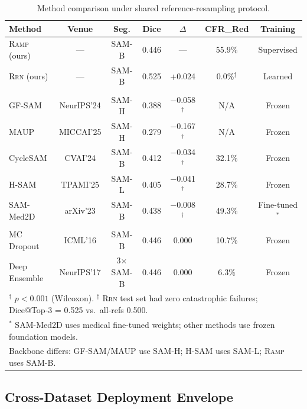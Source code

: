 \documentclass[10pt,twocolumn,letterpaper]{article}
\newcommand{\RAMP}{\textsc{Ramp}}
\newcommand{\RRN}{\textsc{Rrn}}
\begin{document}
\begin{table}[t]
\centering
\caption{Method comparison under shared reference-resampling protocol.}
\label{tab:comparison}
\small
\begin{tabular}{lcccccc}
\toprule
\textbf{Method} & \textbf{Venue} & \textbf{Seg.} & \textbf{Dice} & \textbf{$\Delta$} & \textbf{CFR\_Red} & \textbf{Training}\\
\midrule
\RAMP{} (ours)      & ---      & SAM-B   & 0.446 & ---    & 55.9\% & Supervised\\
\RRN{} (ours)       & ---      & SAM-B   & 0.525 & +0.024 & 0.0\%$^\ddagger$ & Learned\\
\addlinespace
\multicolumn{7}{l}{\textit{Prompting methods (2024--2025)}}\\
GF-SAM           & NeurIPS'24 & SAM-H & 0.388 & $-$0.058$^\dagger$ & N/A & Frozen\\
MAUP             & MICCAI'25 & SAM-H & 0.279 & $-$0.167$^\dagger$ & N/A & Frozen\\
CycleSAM         & CVAI'24   & SAM-B & 0.412 & $-$0.034$^\dagger$ & 32.1\% & Frozen\\
H-SAM            & TPAMI'25  & SAM-L & 0.405 & $-$0.041$^\dagger$ & 28.7\% & Frozen\\
SAM-Med2D        & arXiv'23  & SAM-B & 0.438 & $-$0.008$^\dagger$ & 49.3\% & Fine-tuned$^*$\\
\addlinespace
\multicolumn{7}{l}{\textit{Uncertainty baselines}}\\
MC Dropout       & ICML'16   & SAM-B & 0.446 & 0.000  & 10.7\% & Frozen\\
Deep Ensemble    & NeurIPS'17& 3$\times$SAM-B & 0.446 & 0.000 & 6.3\% & Frozen\\
\bottomrule
\multicolumn{7}{l}{\footnotesize $^\dagger$ $p<0.001$ (Wilcoxon). $^\ddagger$ \RRN{} test set had zero catastrophic failures; Dice@Top-3 = 0.525 vs.\ all-refs 0.500.}\\
\multicolumn{7}{l}{\footnotesize $^*$ SAM-Med2D uses medical fine-tuned weights; other methods use frozen foundation models.}\\
\multicolumn{7}{l}{\footnotesize Backbone differs: GF-SAM/MAUP use SAM-H; H-SAM uses SAM-L; \RAMP{} uses SAM-B.}\\
\end{tabular}
\end{table}

\subsection{Cross-Dataset Deployment Envelope}
\end{document}
